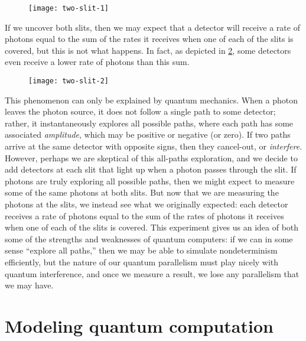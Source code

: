 \documentclass[12pt]{article}
\begin{document}
\begin{figure}[H]
  \texttt{[image: two-slit-1]}
  \caption{\cite[p. 203]{AB09}}
  \label{fig:two-slit-1}
\end{figure}

If we uncover both slits, then we may expect that a detector will receive a rate
of photons equal to the sum of the rates it receives when one of each of the
slits is covered, but this is not what happens. In fact, as depicted in
\cref{fig:two-slit-2}, some detectors even receive a lower rate of photons than
this sum.

\begin{figure}[H]
  \texttt{[image: two-slit-2]}
  \caption{\cite[p. 203]{AB09}}
  \label{fig:two-slit-2}
\end{figure}

This phenomenon can only be explained by quantum mechanics. When a photon leaves
the photon source, it does not follow a single path to some detector; rather, it
instantaneously explores all possible paths, where each path has some associated
\emph{amplitude}, which may be positive or negative (or zero). If two paths
arrive at the same detector with opposite signs, then they cancel-out, or
\emph{interfere}. However, perhaps we are skeptical of this all-paths
exploration, and we decide to add detectors at each slit that light up when a
photon passes through the slit. If photons are truly exploring all possible
paths, then we might expect to measure some of the same photons at both slits.
But now that we are measuring the photons at the slits, we instead see what we
originally expected: each detector receives a rate of photons equal to the
sum of the rates of photons it receives when one of each of the slits is
covered. This experiment gives us an idea of both some of the strengths and
weaknesses of quantum computers: if we can in some sense ``explore all paths,''
then we may be able to simulate nondeterminism efficiently, but the nature of
our quantum parallelism must play nicely with quantum interference, and once we
measure a result, we lose any parallelism that we may have.


\section{Modeling quantum computation}
\end{document}
